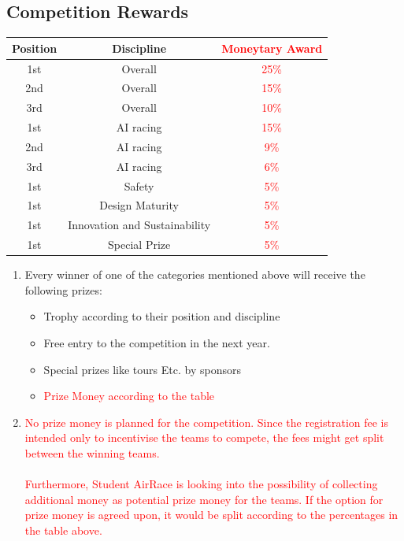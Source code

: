     \subsection{Competition Rewards}
    \begin{center}
        \begin{tabular}{|c|c|c|} 
          \hline
          Position & Discipline & \textcolor{red}{Moneytary Award} \\
          \hline
          1st & Overall & \textcolor{red}{25\%} \\ 
          \hline
          2nd  & Overall & \textcolor{red}{15\%} \\ 
          \hline
          3rd & Overall & \textcolor{red}{10\%} \\ 
          \hline
          1st & AI racing & \textcolor{red}{15\%} \\ 
          \hline
          2nd  & AI racing & \textcolor{red}{9\%} \\ 
          \hline
          3rd & AI racing & \textcolor{red}{6\%} \\ 
          \hline
          1st & Safety & \textcolor{red}{5\%} \\ 
          \hline
          1st & Design Maturity & \textcolor{red}{5\%} \\ 
          \hline
          1st & Innovation and Sustainability & \textcolor{red}{5\%} \\ 
          \hline
          1st & Special Prize & \textcolor{red}{5\%} \\ 
          \hline
        \end{tabular}
      \end{center}
      

    \begin{enumerate}
      \item Every winner of one of the categories mentioned above will receive the following prizes:
      
      \begin{itemize}
        \item Trophy according to their position and discipline
        \item Free entry to the competition in the next year.
        \item Special prizes like tours Etc. by sponsors
        \item \textcolor{red}{Prize Money according to the table}
      \end{itemize}

      \item \textcolor{red}{No prize money is planned for the competition. Since the registration fee is intended only to incentivise the teams to compete, the fees might get split between the winning teams. \\ \\ Furthermore, Student AirRace is looking into 
      the possibility of collecting additional money as potential prize money for the teams. If the option for prize money is agreed upon, it would be split according to the percentages in the table above. }
    \end{enumerate}


